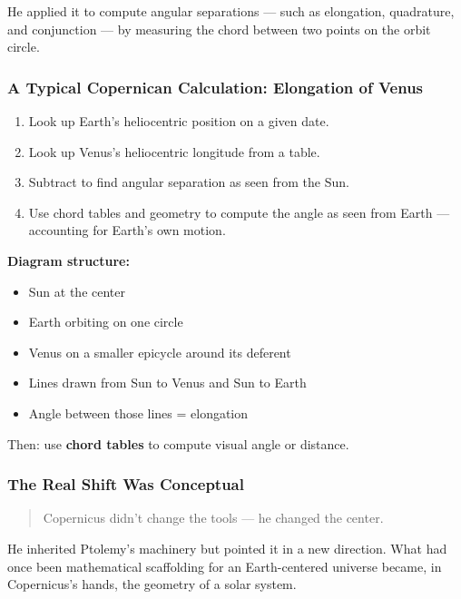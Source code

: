 He applied it to compute angular separations — such as elongation, quadrature, and conjunction — by measuring the chord between two points on the orbit circle.

\subsubsection*{A Typical Copernican Calculation: Elongation of Venus}

\begin{enumerate}
  \item Look up Earth’s heliocentric position on a given date.
  \item Look up Venus’s heliocentric longitude from a table.
  \item Subtract to find angular separation as seen from the Sun.
  \item Use chord tables and geometry to compute the angle as seen from Earth — accounting for Earth's own motion.
\end{enumerate}

\begin{center}
\begin{tcolorbox}[colback=gray!5!white, colframe=black, boxrule=0.3pt, arc=1mm, width=0.9\linewidth]
\textbf{Diagram structure:}  
\begin{itemize}
  \item Sun at the center  
  \item Earth orbiting on one circle  
  \item Venus on a smaller epicycle around its deferent  
  \item Lines drawn from Sun to Venus and Sun to Earth  
  \item Angle between those lines = elongation  
\end{itemize}
Then: use \textbf{chord tables} to compute visual angle or distance.
\end{tcolorbox}
\end{center}

\subsubsection*{The Real Shift Was Conceptual}

\begin{quote}
Copernicus didn’t change the tools — he changed the center.
\end{quote}

He inherited Ptolemy’s machinery but pointed it in a new direction. What had once been mathematical scaffolding for an Earth-centered universe became, in Copernicus’s hands, the geometry of a solar system.

